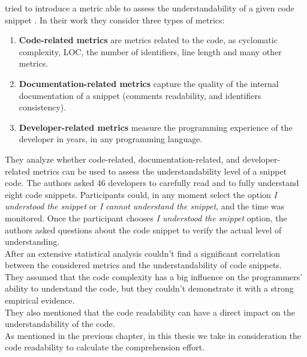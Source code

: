 \documentclass[12pt,mscthesis]{usiinfthesis}
\begin{document}
	\citet{Scalabrino} tried to introduce a metric able to assess the understandability of a given code snippet . In their work they consider three types of metrics:
	\begin{enumerate}
		\item \textbf{Code-related metrics} are metrics related to the code, as cyclomatic complexity, LOC, the number of identifiers, line length and many other metrics.
		\item \textbf{Documentation-related metrics} capture the quality of the internal documentation of a snippet (comments readability, and identifiers consistency). 
		\item \textbf{Developer-related metrics} measure the programming experience of the developer in years, in any programming language.
	\end{enumerate}
	They analyze whether code-related, documentation-related, and developer- related metrics can be used to assess the understandability level of a snippet  code. The authors asked
	46 developers to carefully read and to fully understand eight code snippets. Participants could, in any moment select the option \textit{I understood the snippet} or \textit{I cannot understand the snippet}, and the time was monitored.
	Once the participant chooses \textit{I understood the snippet} option, the authors asked questions about the code snippet to verify the actual level of understanding.\\ After an extensive statistical analysis \citet{Scalabrino} couldn't find a significant correlation between the considered metrics and the understandability of code snippets.\\
	They assumed that the code complexity has a big influence on the programmers' ability to understand the code, but they couldn't demonstrate it with a strong empirical evidence.\\
	They also mentioned that the code readability can have a direct impact on the understandability of the code.\\ As mentioned in the previous chapter, in this thesis we take in consideration the code readability to calculate the comprehension effort.\\
\end{document}
